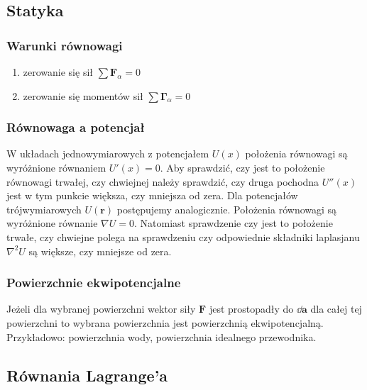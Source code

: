 \documentclass[../main.tex]{subfiles}
\begin{document}
\subsection{Statyka}
\subsubsection*{Warunki równowagi}
\begin{enumerate}
    \item zerowanie się sił \(\sum\mathbf{F}_\alpha=0\)
    \item zerowanie się momentów sił \(\sum\boldsymbol{\Gamma}_\alpha=0\)
\end{enumerate}
\subsubsection{Równowaga a potencjał}
W układach jednowymiarowych z potencjałem \(U(x)\) położenia równowagi są wyróżnione równaniem \(U'(x)=0\). Aby sprawdzić, czy jest to położenie równowagi trwałej, czy chwiejnej należy sprawdzić, czy druga pochodna \(U''(x)\) jest w tym punkcie większa, czy mniejsza od zera. Dla potencjałów trójwymiarowych \(U(\mathbf{r})\) postępujemy analogicznie. Położenia równowagi są wyróżnione równanie \(\nabla U=0\). Natomiast sprawdzenie czy jest to położenie trwałe, czy chwiejne polega na sprawdzeniu czy odpowiednie składniki laplasjanu \(\nabla^2U\) są większe, czy mniejsze od zera.
\subsubsection{Powierzchnie ekwipotencjalne}
Jeżeli dla wybranej powierzchni wektor siły \(\mathbf{F}\) jest prostopadły do \(\dd\mathbf{a}\) dla całej tej powierzchni to wybrana powierzchnia jest powierzchnią ekwipotencjalną. Przykładowo: powierzchnia wody, powierzchnia idealnego przewodnika.

\subsection{Równania Lagrange'a}
\end{document}
